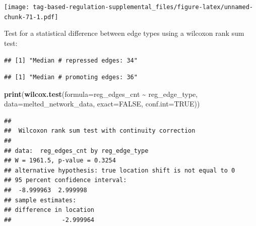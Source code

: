 \documentclass[
]{book}
\newenvironment{Shaded}{\begin{snugshade}}{\end{snugshade}}
\newcommand{\DataTypeTok}[1]{\textcolor[rgb]{0.13,0.29,0.53}{#1}}
\newcommand{\KeywordTok}[1]{\textcolor[rgb]{0.13,0.29,0.53}{\textbf{#1}}}
\newcommand{\NormalTok}[1]{#1}
\newcommand{\OperatorTok}[1]{\textcolor[rgb]{0.81,0.36,0.00}{\textbf{#1}}}
\newcommand{\OtherTok}[1]{\textcolor[rgb]{0.56,0.35,0.01}{#1}}
\newcommand{\StringTok}[1]{\textcolor[rgb]{0.31,0.60,0.02}{#1}}
\begin{document}
\texttt{[image: tag-based-regulation-supplemental\_files/figure-latex/unnamed-chunk-71-1.pdf]}

Test for a statistical difference between edge types using a wilcoxon rank sum test:

\begin{Shaded}
\end{Shaded}

\begin{verbatim}
## [1] "Median # repressed edges: 34"
\end{verbatim}

\begin{Shaded}
\end{Shaded}

\begin{verbatim}
## [1] "Median # promoting edges: 36"
\end{verbatim}

\begin{Shaded}
\begin{Highlighting}[]
\KeywordTok{print}\NormalTok{(}\KeywordTok{wilcox.test}\NormalTok{(}\DataTypeTok{formula=}\NormalTok{reg\_edges\_cnt }\OperatorTok{\textasciitilde{}}\StringTok{ }\NormalTok{reg\_edge\_type, }\DataTypeTok{data=}\NormalTok{melted\_network\_data, }\DataTypeTok{exact=}\OtherTok{FALSE}\NormalTok{, }\DataTypeTok{conf.int=}\OtherTok{TRUE}\NormalTok{))}
\end{Highlighting}
\end{Shaded}

\begin{verbatim}
## 
##  Wilcoxon rank sum test with continuity correction
## 
## data:  reg_edges_cnt by reg_edge_type
## W = 1961.5, p-value = 0.3254
## alternative hypothesis: true location shift is not equal to 0
## 95 percent confidence interval:
##  -8.999963  2.999998
## sample estimates:
## difference in location 
##              -2.999964
\end{verbatim}
\end{document}
